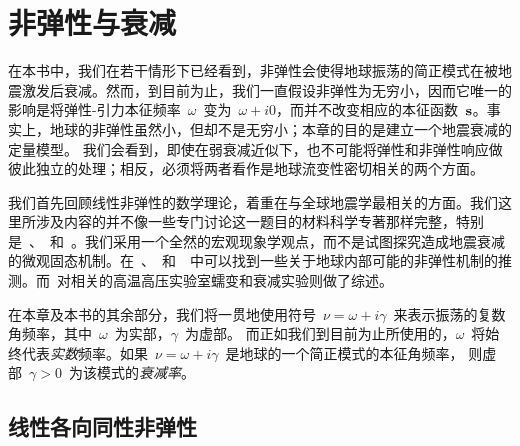 \chapter{非弹性与衰减}

在本书中，我们在若干情形下已经看到，非弹性会使得地球振荡的简正模式在被地震激发后衰减。然而，到目前为止，我们一直假设非弹性为无穷小，因而它唯一的影响是将弹性-引力本征频率~$\omega$~变为~$\omega+i0$，而并不改变相应的本征函数~$\mbox{${\bf s}$}$。事实上，地球的非弹性虽然小，但却不是无穷小；本章的目的是建立一个地震衰减的定量模型。
%
我们会看到，即使在弱衰减近似下，也不可能将弹性和非弹性响应做彼此独立的处理；相反，必须将两者看作是地球流变性密切相关的两个方面。
\enlargethispage{-0.5\baselineskip}

我们首先回顾线性非弹性的数学理论，着重在与全球地震学最相关的方面。我们这里所涉及内容的并不像一些专门讨论这一题目的材料科学专著那样完整，特别是~\textcite{zener48}、\textcite{gross53}~和~\textcite{nowick&berry72}。我们采用一个全然的宏观现象学观点，而不是试图探究造成地震衰减的微观固态机制。在~\textcite{minster80}、\textcite{karato&spetzler90}~和~\textcite{anderson89}~中可以找到一些关于地球内部可能的非弹性机制的推测。而\textcite{jackson93}~对相关的高温高压实验室蠕变和衰减实验则做了综述。

在本章及本书的其余部分，我们将一贯地使用符号~$\nu=\omega+i\gamma$~来表示振荡的复数角频率，其中~$\omega$~为实部，$\gamma$~为虚部。
%
%
而正如我们到目前为止所使用的，$\omega$~将始终代表{\em 实数\/}频率。如果~$\nu=\omega+i\gamma$~是地球的一个简正模式的本征角频率，
%
则虚部~$\gamma > 0$~为该模式的{\em 衰减率\/}。

\section{线性各向同性非弹性}
%

